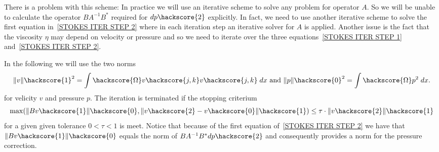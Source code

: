 There is a problem with this scheme: In practice we will use an iterative scheme
to solve any problem for operator $A$. So we will be unable to calculate the operator
$ B A^{-1} B^{*}$ required for $dp\hackscore{2}$ explicitly. In fact, we need to use another
iterative scheme to solve the first equation in~\ref{STOKES ITER STEP 2} where in each iteration step
an iterative solver for $A$ is applied. Another issue is the fact that the
viscosity $\eta$ may depend on velocity or pressure and so we need to iterate over the 
three equations~\ref{STOKES ITER STEP 1} and~\ref{STOKES ITER STEP 2}. 

In the following we will use the two norms
\begin{equation}
\|v\|\hackscore{1}^2 = \int\hackscore{\Omega} v\hackscore{j,k}v\hackscore{j,k} \; dx 
\mbox{ and }
\|p\|\hackscore{0}^2= \int\hackscore{\Omega} p^2 \; dx.
\label{STOKES STOP}
\end{equation}
for velicity $v$ and pressure $p$. The iteration is terminated if the stopping criterium
 \begin{equation} \label{STOKES STOPPING CRITERIA}
\max(\|Bv\hackscore{1}\|\hackscore{0},\|v\hackscore{2}-v\hackscore{0}\|\hackscore{1}) \le \tau \cdot \|v\hackscore{2}\|\hackscore{1} 
 \end{equation}
 for a given  given tolerance $0<\tau<1$ is meet. Notice that because of the first equation of~\ref{STOKES ITER STEP 2} we have that
$\|Bv\hackscore{1}\|\hackscore{0}$ equals the
norm of $B A^{-1} B^{*} dp\hackscore{2}$ and consequently provides a norm for the pressure correction.

